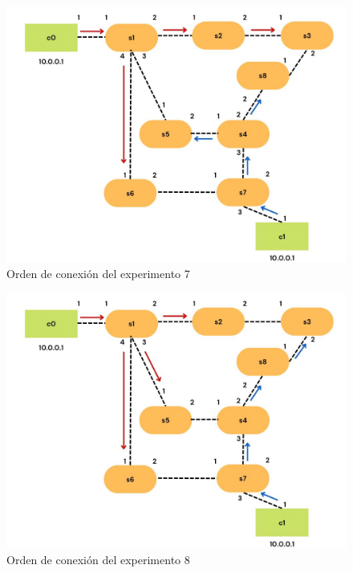 \documentclass[a4paper, 12pt]{book}
\begin{document}
 	\begin{figure}
 		\centering
 		\includegraphics[width=16cm, keepaspectratio]{img/escenario1_2c_6}
 		\caption{Orden de conexión del experimento 7}
 		\label{figura:escenario1_2c_6}
 	\end{figure}
 	
 	\begin{figure}[H]
 		\centering
 		\includegraphics[width=16cm, keepaspectratio]{img/escenario1_2c_7}
 		\caption{Orden de conexión del experimento 8}
 		\label{figura:escenario1_2c_7}
 	\end{figure}
 	
\end{document}
